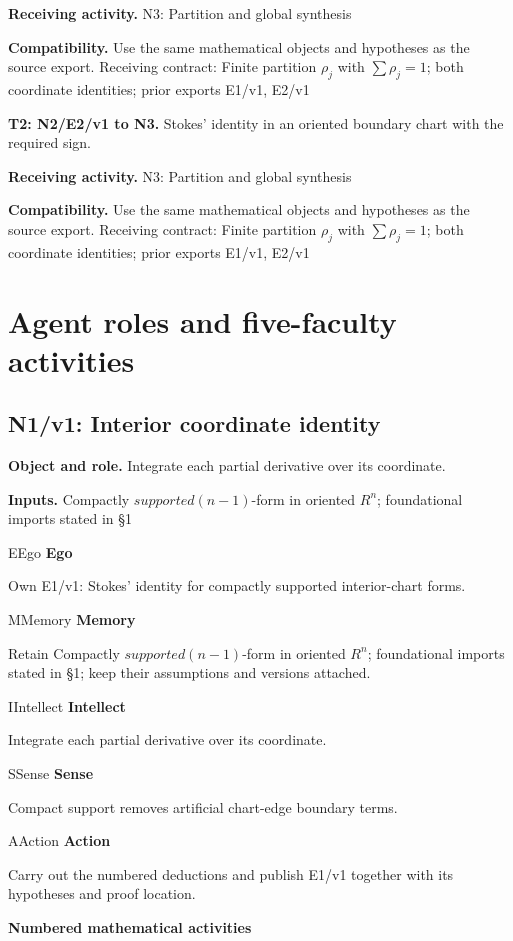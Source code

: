\documentclass[preprint,12pt,aps,pra,showkeys,amsmath,amssymb,superscriptaddress,floatfix]{revtex4-2}
\theoremstyle{definition}
\theoremstyle{remark}
\newcommand{\mmfaculty}[3]{%
 \begin{mmfacultybox}{#1}{#2}
 {\sffamily\bfseries\color{MMBlue}#2}\par\smallskip #3
 \end{mmfacultybox}}
\newcommand{\field}[2]{\par\smallskip\noindent\textbf{#1.} #2\par}
\begin{document}
\field{Receiving activity}{N3: Partition and global synthesis}

\field{Compatibility}{Use the same mathematical objects and hypotheses as the source export.
Receiving contract: Finite partition \(\rho _j\) with
\(\sum \rho _j=1\); both coordinate identities; prior exports E1/v1,
E2/v1}

\field{T2: N2/E2/v1 to N3}{Stokes' identity in an oriented boundary chart with the required sign.}

\field{Receiving activity}{N3: Partition and global synthesis}

\field{Compatibility}{Use the same mathematical objects and hypotheses as the source export.
Receiving contract: Finite partition \(\rho _j\) with
\(\sum \rho _j=1\); both coordinate identities; prior exports E1/v1,
E2/v1}

\endgroup

\clearpage\section{Agent roles and five-faculty activities}\begingroup\small\linespread{1.05}\selectfont{}

\subsection{N1/v1: Interior coordinate identity}

\field{Object and role}{Integrate each partial derivative over its coordinate.}

\field{Inputs}{Compactly \(supported(n-1)\)-form in oriented \(R^{n}\); foundational
imports stated in §1}

\mmfaculty{E}{Ego}{Own E1/v1: Stokes' identity for compactly supported interior-chart
forms.}

\mmfaculty{M}{Memory}{Retain Compactly \(supported(n-1)\)-form in oriented \(R^{n}\);
foundational imports stated in §1; keep their assumptions and versions
attached.}

\mmfaculty{I}{Intellect}{Integrate each partial derivative over its coordinate.}

\mmfaculty{S}{Sense}{Compact support removes artificial chart-edge boundary terms.}

\mmfaculty{A}{Action}{Carry out the numbered deductions and publish E1/v1 together with its
hypotheses and proof location.}

\smallskip\noindent\textbf{Numbered mathematical activities}
\end{document}
